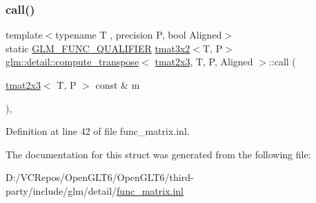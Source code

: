 \subsubsection{\texorpdfstring{call()}{call()}}
{\footnotesize\ttfamily template$<$typename T , precision P, bool Aligned$>$ \\
static \mbox{\hyperlink{setup_8hpp_a33fdea6f91c5f834105f7415e2a64407}{G\+L\+M\+\_\+\+F\+U\+N\+C\+\_\+\+Q\+U\+A\+L\+I\+F\+I\+ER}} \mbox{\hyperlink{structglm_1_1tmat3x2}{tmat3x2}}$<$T, P$>$ \mbox{\hyperlink{structglm_1_1detail_1_1compute__transpose}{glm\+::detail\+::compute\+\_\+transpose}}$<$ \mbox{\hyperlink{structglm_1_1tmat2x3}{tmat2x3}}, T, P, Aligned $>$\+::call (\begin{DoxyParamCaption}\item[{\mbox{\hyperlink{structglm_1_1tmat2x3}{tmat2x3}}$<$ T, P $>$ const \&}]{m }\end{DoxyParamCaption})\hspace{0.3cm}{\ttfamily [inline]}, {\ttfamily [static]}}



Definition at line 42 of file func\+\_\+matrix.\+inl.



The documentation for this struct was generated from the following file\+:\begin{DoxyCompactItemize}
\item 
D\+:/\+V\+C\+Repos/\+Open\+G\+L\+T6/\+Open\+G\+L\+T6/third-\/party/include/glm/detail/\mbox{\hyperlink{func__matrix_8inl}{func\+\_\+matrix.\+inl}}\end{DoxyCompactItemize}
